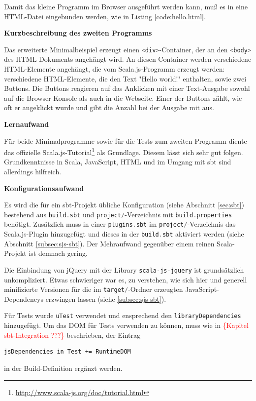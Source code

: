 \documentclass[a4paper, 12pt, hidelinks, listof=totoc, listoftables=totoc, bibliography=totoc]{scrreprt}
\newcommand{\code}[1]{\lstinline[language=Scala, style=inline]|#1|}
\newcommand{\TODOi}[1]{\textcolor{red}{\{#1\}}}
\newcommand{\MyMiniSec}[1]{\rmfamily\fontsize{12}{15}\selectfont
	\vspace{7pt}\textbf{#1} %
}
\begin{document}
Damit das kleine Programm im Browser ausgeführt werden kann, muß es in eine \ac{HTML}-Datei eingebunden werden, wie in Listing \ref{code:hello.html}.




\MyMiniSec{Kurzbeschreibung des zweiten Programms}

Das erweiterte Minimalbeispiel erzeugt einen \code{<div>}-Container, der an den \code{<body>} des \ac{HTML}-Dokuments angehängt wird. An diesen Container werden verschiedene \ac{HTML}-Elemente angehängt, die vom Scala.js-Programm erzeugt werden: verschiedene \ac{HTML}-Elemente, die den Text "Hello world!" enthalten, sowie zwei Buttons. Die Buttons reagieren auf das Anklicken mit einer Text-Ausgabe sowohl auf die Browser-Konsole als auch in die Webseite. Einer der Buttons zählt, wie oft er angeklickt wurde und gibt die Anzahl bei der Ausgabe mit aus.


\MyMiniSec{Lernaufwand}

Für beide Minimalprogramme sowie für die Tests zum zweiten Programm diente das offizielle Scala.js-Tutorial\footnote{\url{http://www.scala-js.org/doc/tutorial.html}} als Grundlage. Diesem lässt sich sehr gut folgen. Grundkenntnisse in Scala, JavaScript, \ac{HTML} und im Umgang mit sbt sind allerdings hilfreich.


\MyMiniSec{Konfigurationsaufwand}

Es wird die für ein sbt-Projekt übliche Konfiguration (siehe Abschnitt \ref{sec:sbt}) bestehend aus \code{build.sbt} und \code{project/}-Verzeichnis mit \code{build.properties} benötigt. Zusätzlich muss in einer \code{plugins.sbt} im \code{project/}-Verzeichnis das Scala.js-Plugin hinzugefügt und dieses in der \code{build.sbt} aktiviert werden (siehe Abschnitt \ref{subsec:sjs-sbt}). Der Mehraufwand gegenüber einem reinen Scala-Projekt ist demnach gering. 


Die Einbindung von jQuery mit der Library \code{scala-js-jquery} ist grundsätzlich unkompliziert. Etwas schwieriger war es, zu verstehen, wie sich hier und generell minifizierte Versionen für die im \code{target/}-Ordner erzeugten JavaScript-Dependencys erzwingen lassen (siehe \ref{subsec:sjs-sbt}).




Für Tests wurde \code{uTest} verwendet und ensprechend den \code{libraryDependencies} hinzugefügt. Um das \ac{DOM} für Tests verwenden zu können, muss wie in \TODOi{Kapitel sbt-Integration ???} beschrieben, der Eintrag
\begin{lstlisting}[style=snippet]
jsDependencies in Test += RuntimeDOM
\end{lstlisting}
in der Build-Definition ergänzt werden.
\end{document}
